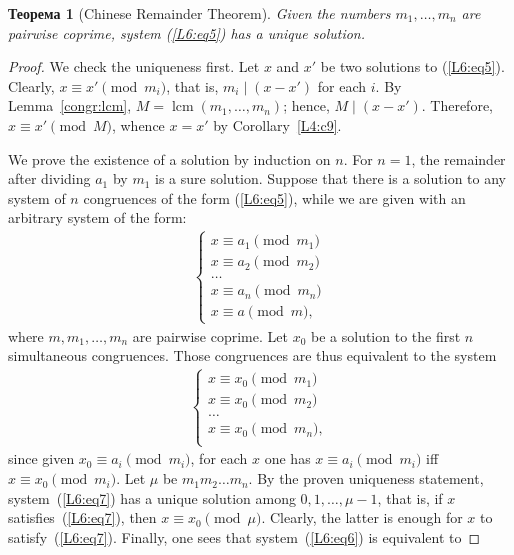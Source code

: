 \documentclass[12pt,notitlepage]{article}
\theoremstyle{plain}
\newtheorem{thm}{Теорема}[section]
\theoremstyle{definition}
\theoremstyle{plain}
\newcommand{\1}{\mathbf{1}}
\newcommand{\0}{\mathbf{0}}
\newcommand{\dvd}{\mathop{\mid}}
\DeclareMathOperator{\lcm}{lcm}
\begin{document}
\begin{thm}[Chinese Remainder Theorem]\label{L6:t_chinese}
	Given the numbers $m_1, \ldots, m_n$ are pairwise coprime, system (\ref{L6:eq5}) has a unique solution.
\end{thm}
\begin{proof}
	We check the uniqueness first. Let $x$ and $x'$ be two solutions to (\ref{L6:eq5}). Clearly, $x \equiv x' \pmod {m_i}$, that is, $m_i \dvd (x - x')$ for each $i$. By Lemma~\ref{congr:lcm}, $M = \lcm(m_1, \ldots, m_n)$; hence, $M \dvd (x - x')$. Therefore, $x \equiv x' \pmod M$, whence $x = x'$ by Corollary~\ref{L4:c9}.
	
	We prove the existence of a solution by induction on $n$. For $n = 1$, the remainder after dividing $a_1$ by $m_1$ is a sure solution. Suppose that there is a solution to any system of $n$ congruences of the form (\ref{L6:eq5}), while we are given with an arbitrary system of the form:
	\begin{equation}\label{L6:eq6}
		\begin{array}{l}
			\begin{cases}
				x \equiv a_1 \pmod {m_1}\\
				x \equiv a_2 \pmod {m_2}\\
				\ldots\\
				x \equiv a_n \pmod {m_n}\\
				x \equiv a \pmod {m},
			\end{cases}
		\end{array}
	\end{equation}
	where $m, m_1, \ldots, m_n$ are pairwise coprime.
	Let $x_0$ be a solution to the first $n$ simultaneous congruences. Those congruences are thus equivalent to the system
	\begin{equation}\label{L6:eq7}
		\begin{array}{l}
			\begin{cases}
				x \equiv x_0 \pmod {m_1}\\
				x \equiv x_0 \pmod {m_2}\\
				\ldots\\
				x \equiv x_0 \pmod {m_n},\\
			\end{cases}
		\end{array}
	\end{equation}
	since given $x_0 \equiv a_i \pmod{m_i}$, for each $x$ one has $x \equiv a_i \pmod {m_i}$ iff $x \equiv x_0 \pmod {m_i}$. Let $\mu$ be $m_1 m_2 \ldots m_n$. By the proven uniqueness statement, system~(\ref{L6:eq7}) has a unique solution among $0, 1, \ldots, \mu - 1$, that is, if $x$ satisfies~(\ref{L6:eq7}), then $x \equiv x_0 \pmod \mu$. Clearly, the latter is enough for $x$ to satisfy~(\ref{L6:eq7}). Finally, one sees that system~(\ref{L6:eq6}) is equivalent to

\end{proof}
\end{document}
